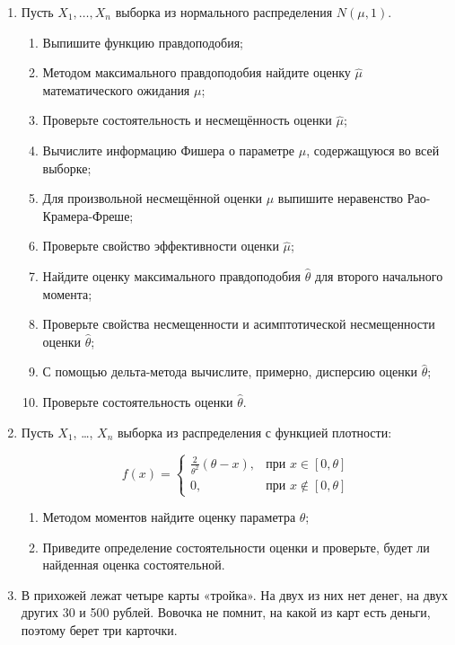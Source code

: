 \begin{enumerate}[resume]

	\item Пусть $X_{1}, \ldots, X_{n}$ выборка из нормального распределения $N(\mu,1)$.
	\begin{enumerate}
		\item Выпишите функцию правдоподобия;
		\item Методом максимального правдоподобия найдите оценку $\hat{\mu}$ математического ожидания $\mu$;

		\item Проверьте состоятельность и несмещённость оценки $\hat{\mu}$;
		\item Вычислите информацию Фишера о параметре $\mu$, содержащуюся во всей выборке;
		\item Для произвольной несмещённой оценки $\mu$ выпишите неравенство Рао-Крамера-Фреше;
		\item Проверьте свойство эффективности оценки $\hat{\mu}$;
		\item Найдите оценку максимального правдоподобия $\hat{\theta}$ для второго начального момента;
	\item Проверьте свойства несмещенности и асимптотической несмещенности оценки $\hat{\theta}$;
	\item С помощью дельта-метода вычислите, примерно, дисперсию оценки $\hat{\theta}$;
	\item Проверьте состоятельность оценки $\hat{\theta}$.
\end{enumerate}

 	\item Пусть $X_{1}$, \ldots, $X_{n}$ выборка из распределения с функцией плотности:

\[
f(x)=\begin{cases}
 		\frac{2}{\theta^2}(\theta-x),&\text{при }x\in[0,\theta]\\
 		0,&\text{при }x\notin[0,\theta]
 		\end{cases}
\]


 \begin{enumerate}
 	\item Методом моментов найдите оценку параметра $\theta$;
 	\item Приведите определение состоятельности оценки и проверьте, будет ли найденная оценка состоятельной.
 \end{enumerate}

	\item В прихожей лежат четыре карты «тройка». На двух из них нет денег, на двух других 30 и 500 рублей. Вовочка не помнит, на какой из карт есть деньги, поэтому берет три карточки.


\end{enumerate}
